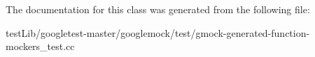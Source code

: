 The documentation for this class was generated from the following file\+:\begin{DoxyCompactItemize}
\item 
test\+Lib/googletest-\/master/googlemock/test/gmock-\/generated-\/function-\/mockers\+\_\+test.\+cc\end{DoxyCompactItemize}
